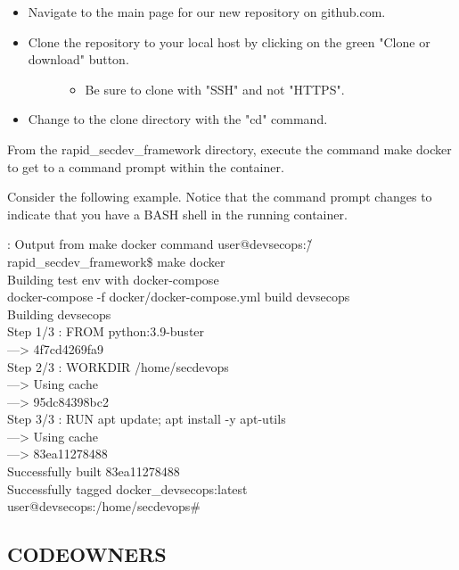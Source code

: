 \begin{itemize}
\item
  Navigate to the main page for our new repository on github.com.
\item
  \begin{description}
  \item[Clone the repository to your local host by clicking on the green
  "Clone or download" button.]
  \begin{itemize}

  \item
    Be sure to clone with "SSH" and not "HTTPS".
  \end{itemize}
  \end{description}
\item
  Change to the clone directory with the "cd" command.
\end{itemize}

From the rapid\_secdev\_framework directory, execute the command
make docker to get to a command prompt within the container.

Consider the following example. Notice that the command prompt changes
to indicate that you have a BASH shell in the running container.

\begin{mybox}{\thetcbcounter: Output from make docker command}
user@devsecops:\~/rapid\_secdev\_framework\$ make docker\\
Building test env with docker-compose\\
docker-compose -f docker/docker-compose.yml build devsecops\\
Building devsecops\\
Step 1/3 : FROM python:3.9-buster\\
---> 4f7cd4269fa9\\
Step 2/3 : WORKDIR /home/secdevops\\
---> Using cache\\
---> 95dc84398bc2\\
Step 3/3 : RUN apt update; apt install -y apt-utils\\
---> Using cache\\
---> 83ea11278488\\
Successfully built 83ea11278488\\
Successfully tagged docker\_devsecops:latest\\
user@devsecops:/home/secdevops\#
\end{mybox}


\subsection{CODEOWNERS}

